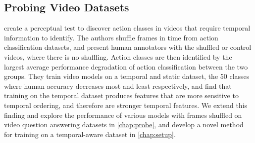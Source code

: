 \subsection{Probing Video Datasets}
\label{ssec:tempprobes}
\citet{sevilla-lara2021temporal} create a perceptual test to discover action
classes in videos that require temporal information to identify. The authors
shuffle frames in time from action classification datasets, and present human
annotators with the shuffled or control videos, where there is no shuffling.
Action classes are then identified by the largest average performance
degradation of action classification between the two groups. They train video
models on a temporal and static dataset, the 50 classes where human accuracy
decreases most and least respectively, and find that training on the temporal
dataset produces features that are more sensitive to temporal ordering, and
therefore are stronger temporal features.
We extend this finding and explore the performance of various models with
frames shuffled on video question answering datasets in \cref{chap:probe}, and
develop a novel method for training  on a temporal-aware
dataset in \cref{chap:setup}.

%
%
%
%
